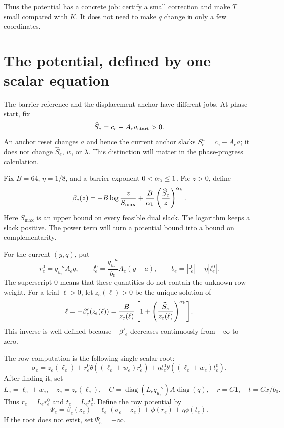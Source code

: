 \documentclass[11pt]{article}
\theoremstyle{definition}\newtheorem{definition}[theorem]{Definition}
\theoremstyle{remark}\newtheorem{remark}[theorem]{Remark}
\newcommand{\one}{\mathbf1}
\newcommand{\diag}{\operatorname{diag}}
\begin{document}
Thus the potential has a concrete job: certify a small correction and
make $T$ small compared with $K$. It does not need to make $q$ change
in only a few coordinates.

\section{The potential, defined by one scalar equation}
\label{sec:potential}\label{sec:envelope-ranges}

The barrier reference and the displacement anchor have different jobs.
At phase start, fix
\[
 \widehat S_e=c_e-A_ea_{\rm start}>0.
\]
An anchor reset changes $a$ and hence the current anchor slacks
$S_e^a=c_e-A_ea$; it does not change $\widehat S_e$, $w$, or $\lambda$.
This distinction will matter in the phase-progress calculation.

Fix $B=64$, $\eta=1/8$, and a barrier exponent $0<\alpha_{\rm b}\le1$.
For $z>0$, define
\[
 \beta_e(z)=-B\log\frac z{S_{\max}}
       +\frac B{\alpha_{\rm b}}
              \left(\frac{\widehat S_e}{z}\right)^{\alpha_{\rm b}}.
\]
Here $S_{\max}$ is an upper bound on every feasible dual slack.
The logarithm keeps a slack positive.  The power term will turn a
potential bound into a bound on complementarity.

For the current $(y,q)$, put
\[
 r_e^0=q_{u_e}^{-\kappa}A_eq,\qquad
 t_e^0=\frac{q_{u_e}^{-\kappa}}{b_0}A_e(y-a),\qquad
 b_e=|r_e^0|+\eta|t_e^0|.
\]
The superscript $0$ means that these quantities do not contain the
unknown row weight.  For a trial $\ell>0$, let $z_e(\ell)>0$ be the
unique solution of
\begin{equation}\label{eq:barrier-inverse}
 \ell=-\beta'_e(z_e(\ell))
 =\frac B{z_e(\ell)}
       \left[1+\left(\frac{\widehat S_e}{z_e(\ell)}\right)
                         ^{\alpha_{\rm b}}\right].
\end{equation}
This inverse is well defined because $-\beta'_e$ decreases continuously
from $+\infty$ to zero.

The row computation is the following single scalar root:
\begin{equation}\label{eq:envelope-root-exact}
 \sigma_e=z_e(\ell_e)
   +r_e^0\theta((\ell_e+w_e)r_e^0)
   +\eta t_e^0\theta((\ell_e+w_e)t_e^0).
\end{equation}
After finding it, set
\[
 L_e=\ell_e+w_e,\quad z_e=z_e(\ell_e),\quad
 C=\diag(L_eq_{u_e}^{-\kappa})A\diag(q),\quad
 r=C\one,\quad t=Cx/b_0.
\]
Thus $r_e=L_er_e^0$ and $t_e=L_et_e^0$.  Define the row potential by
\begin{equation}\label{eq:row-root-value}
 \boxed{\quad
 \Psi_e=\beta_e(z_e)-\ell_e(\sigma_e-z_e)
                         +\phi(r_e)+\eta\phi(t_e).\quad}
\end{equation}
If the root does not exist, set $\Psi_e=+\infty$.
\end{document}
